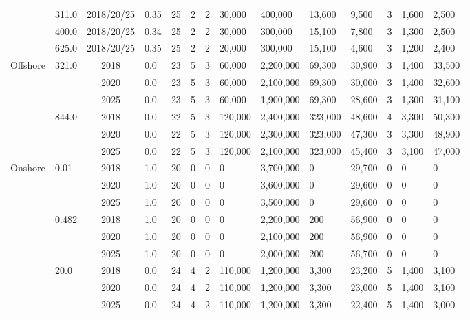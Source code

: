 \begin{table*}[]
\begin{tabularx}{\linewidth}{|p{}|l|c|l|l|l|l|l|l|l|l|l|l|l|}
& 311.0 & 2018/20/25 & 0.35 & 25 & 2 & 2 & 30,000 & 400,000 & 13,600 & 9,500 & 3 & 1,600 & 2,500 \\ \cline{2-14} 
& 400.0 & 2018/20/25 & 0.34 & 25 & 2 & 2 & 30,000 & 300,000 & 15,100 & 7,800 & 3 & 1,300 & 2,500 \\ \cline{2-14} 
& 625.0 & 2018/20/25 & 0.35 & 25 & 2 & 2 & 20,000 & 300,000 & 15,100 & 4,600 & 3 & 1,200 & 2,400 \\ \hline
\multirow{6}{*}{Offshore} & \multirow{3}{*}{321.0} & 2018 & 0.0 & 23 & 5 & 3 & 60,000 & 2,200,000 & 69,300 & 30,900 & 3 & 1,400 & 33,500 \\ \cline{3-14} 
&  & 2020 & 0.0 & 23 & 5 & 3 & 60,000 & 2,100,000 & 69,300 & 30,000 & 3 & 1,400 & 32,600 \\ \cline{3-14} 
&  & 2025 & 0.0 & 23 & 5 & 3 & 60,000 & 1,900,000 & 69,300 & 28,600 & 3 & 1,300 & 31,100 \\ \cline{2-14} 
& \multirow{3}{*}{844.0} & 2018 & 0.0 & 22 & 5 & 3 & 120,000 & 2,400,000 & 323,000 & 48,600 & 4 & 3,300 & 50,300 \\ \cline{3-14} 
&  & 2020 & 0.0 & 22 & 5 & 3 & 120,000 & 2,300,000 & 323,000 & 47,300 & 3 & 3,300 & 48,900 \\ \cline{3-14} 
&  & 2025 & 0.0 & 22 & 5 & 3 & 120,000 & 2,100,000 & 323,000 & 45,400 & 3 & 3,100 & 47,000 \\ \hline
\multirow{9}{*}{Onshore} & \multirow{3}{*}{0.01} & 2018 & 1.0 & 20 & 0 & 0 & 0 & 3,700,000 & 0 & 29,700 & 0 & 0 & 0 \\ \cline{3-14} 
&  & 2020 & 1.0 & 20 & 0 & 0 & 0 & 3,600,000 & 0 & 29,600 & 0 & 0 & 0 \\ \cline{3-14} 
&  & 2025 & 1.0 & 20 & 0 & 0 & 0 & 3,500,000 & 0 & 29,600 & 0 & 0 & 0 \\ \cline{2-14} 
& \multirow{3}{*}{0.482} & 2018 & 1.0 & 20 & 0 & 0 & 0 & 2,200,000 & 200 & 56,900 & 0 & 0 & 0 \\ \cline{3-14} 
&  & 2020 & 1.0 & 20 & 0 & 0 & 0 & 2,100,000 & 200 & 56,900 & 0 & 0 & 0 \\ \cline{3-14} 
&  & 2025 & 1.0 & 20 & 0 & 0 & 0 & 2,000,000 & 200 & 56,700 & 0 & 0 & 0 \\ \cline{2-14} 
& \multirow{3}{*}{20.0} & 2018 & 0.0 & 24 & 4 & 2 & 110,000 & 1,200,000 & 3,300 & 23,200 & 5 & 1,400 & 3,100 \\ \cline{3-14} 
&  & 2020 & 0.0 & 24 & 4 & 2 & 110,000 & 1,200,000 & 3,300 & 23,000 & 5 & 1,400 & 3,100 \\ \cline{3-14} 
&  & 2025 & 0.0 & 24 & 4 & 2 & 110,000 & 1,200,000 & 3,300 & 22,400 & 5 & 1,400 & 3,000 \\ \hline

\end{tabularx}
\end{table*}
